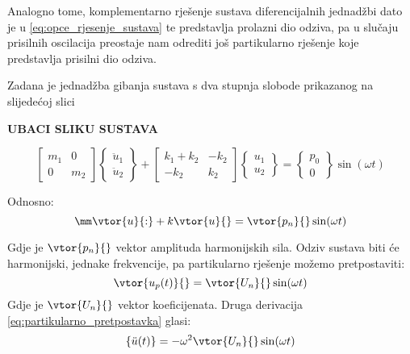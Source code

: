 Analogno tome, komplementarno rješenje sustava diferencijalnih jednadžbi dato je u
\eqref{eq:opce_rjesenje_sustava} te predstavlja prolazni dio odziva, pa u slučaju
prisilnih oscilacija preostaje nam odrediti još partikularno rješenje koje
predstavlja prisilni dio odziva. 
\par

Zadana je jednadžba gibanja sustava s dva stupnja slobode prikazanog na slijedećoj
slici

\textbf{UBACI SLIKU SUSTAVA}

\begin{equation}\label{eq:jednadzba_gibanja_matricno}
    \begin{bmatrix}
        m_1 & 0 \\
        0   & m_2
    \end{bmatrix}
    \begin{Bmatrix}
        \ddot{u}_1\\
        \ddot{u}_2
    \end{Bmatrix}
    +
    \begin{bmatrix}
        k_1+k_2 & -k_2\\
        -k_2 & k_2
    \end{bmatrix}
    \begin{Bmatrix}
        u_1\\
        u_2
    \end{Bmatrix}
    =
    \begin{Bmatrix}
        p_0\\
        0 
    \end{Bmatrix}
    \sin(\omega t)
\end{equation}

Odnosno:
\begin{equation}\label{eq:jednadzba_gibanja_matricno_kratko}
    \mm\vtor{u}{:}+k\vtor{u}{}=\vtor{p_n}{}\sin(\omega t)
\end{equation}

Gdje je $\vtor{p_n}{}$ vektor amplituda harmonijskih sila. Odziv sustava biti će
harmonijski, jednake frekvencije, pa partikularno rješenje možemo pretpostaviti:
\begin{equation}\label{eq:partikularno_pretpostavka}
    \vtor{u_p(t)}{}=\vtor{U_n}{}\sin(\omega t)
\end{equation}
Gdje je $\vtor{U_n}{}$ vektor koeficijenata.
Druga derivacija \eqref{eq:partikularno_pretpostavka} glasi:
\begin{equation}\label{eq:partikularno_pretpostavka_dd}
    \{\ddot{u}(t)\}=-\omega^2\vtor{U_n}{}\sin(\omega t)
\end{equation}

